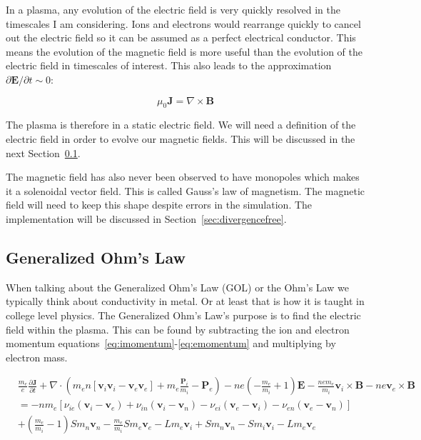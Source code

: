 \documentclass[12pt,upcase]{umlthesis}
\begin{document}
In a plasma, any evolution of the electric field is very quickly resolved in the timescales I am considering. Ions and electrons would rearrange quickly to cancel out the electric field so it can be assumed as a perfect electrical conductor. This means the evolution of the magnetic field is more useful than the evolution of the electric field in timescales of interest. This also leads to the approximation $\partial\textbf{E}/\partial t \sim 0$:

\begin{equation}\label{eq:ampereslawapprox}
	\mu_0\textbf{J} = \nabla\times\textbf{B}
\end{equation}

The plasma is therefore in a static electric field. We will need a definition of the electric field in order to evolve our magnetic fields. This will be discussed in the next Section~\ref{sec:ohmslaw}.

The magnetic field has also never been observed to have monopoles which makes it a solenoidal vector field. This is called Gauss's law of magnetism. The magnetic field will need to keep this shape despite errors in the simulation. The implementation will be discussed in Section~\ref{sec:divergencefree}.

\subsection{Generalized Ohm's Law}\label{sec:ohmslaw}

When talking about the Generalized Ohm's Law (GOL) or the Ohm's Law we typically think about conductivity in metal. Or at least that is how it is taught in college level physics. The Generalized Ohm's Law's purpose is to find the electric field within the plasma. This can be found by subtracting the ion and electron momentum equations~\ref{eq:imomentum}-\ref{eq:emomentum} and multiplying by electron mass.

\begin{equation}
\begin{aligned}
	&\frac{m_e}{e}\frac{\partial \textbf{J}}{\partial t} + \nabla \cdot (m_e n [\textbf{v}_i \textbf{v}_i - \textbf{v}_e \textbf{v}_e] +m_e \frac{\textbf{P}_i}{m_i} - \textbf{P}_e) - n e (-\frac{m_e}{m_i}+1) \textbf{E} - \frac{n e m_e}{m_i} \textbf{v}_i \times \textbf{B} - n e\textbf{v}_e \times \textbf{B} \\
	&= -n m_e [ \nu_{ie} (\textbf{v}_i -\textbf{v}_e) + \nu_{in} (\textbf{v}_i -\textbf{v}_n) - \nu_{ei} (\textbf{v}_e -\textbf{v}_i) - \nu_{en} (\textbf{v}_e -\textbf{v}_n)] \\
	&+ (\frac{m_e}{m_i} - 1) S m_n \textbf{v}_n - \frac{m_e}{m_i} S m_e \textbf{v}_e - L m_e \textbf{v}_i + S m_n \textbf{v}_n - S m_i \textbf{v}_i - L m_e \textbf{v}_e
\end{aligned}
\end{equation}
\end{document}
